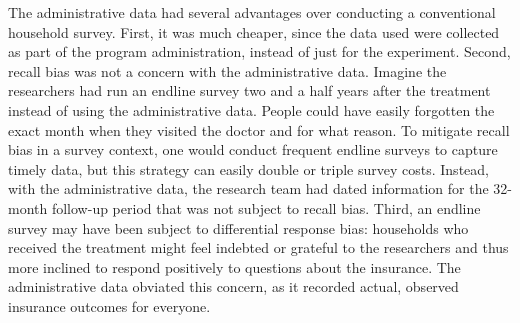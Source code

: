 \documentclass[
]{WileySix}
\begin{document}
The administrative data had several advantages over conducting a conventional household survey. First, it was much cheaper, since the data used were collected as part of the program administration, instead of just for the experiment. Second, recall bias was not a concern with the administrative data. Imagine the researchers had run an endline survey two and a half years after the treatment instead of using the administrative data. People could have easily forgotten the exact month when they visited the doctor and for what reason. To mitigate recall bias in a survey context, one would conduct frequent endline surveys to capture timely data, but this strategy can easily double or triple survey costs. Instead, with the administrative data, the research team had dated information for the 32-month follow-up period that was not subject to recall bias. Third, an endline survey may have been subject to differential response bias: households who received the treatment might feel indebted or grateful to the researchers and thus more inclined to respond positively to questions about the insurance. The administrative data obviated this concern, as it recorded actual, observed insurance outcomes for everyone.
\end{document}
